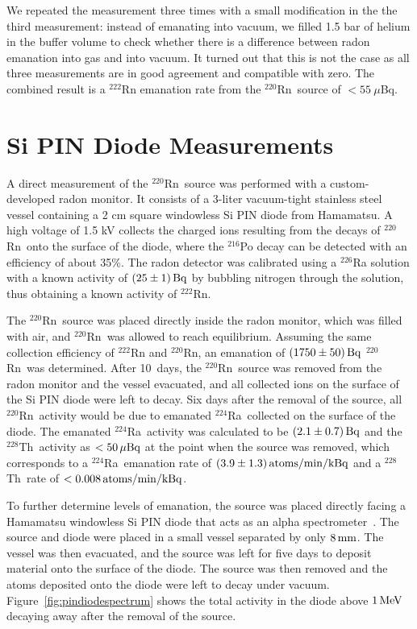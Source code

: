 We repeated the measurement three times with a small modification in the the third measurement: instead of emanating into vacuum, we filled 1.5 bar of helium in the buffer volume to check whether there is a difference between radon emanation into gas and into vacuum. It turned out that this is not the case as all three measurements are in good agreement and compatible with zero. The combined result is a $^{222}$Rn emanation rate from the $^{220}$Rn~source of $<55~\mu$Bq.

\section{Si PIN Diode Measurements}
\label{sec:diode}
A direct measurement of the $^{220}$Rn~source was performed with a custom-developed radon monitor. It consists of a 3-liter vacuum-tight stainless steel vessel containing a 2 cm square windowless Si PIN diode from Hamamatsu. A high voltage of 1.5 kV collects the charged ions resulting from the decays of $^{220}$Rn~onto the surface of the diode, where the $^{216}$Po decay can be detected with an efficiency of about 35\%. The radon detector was calibrated using a $^{226}$Ra solution with a known activity of $(25\pm1)\,\mathrm{Bq}$ by bubbling nitrogen through the solution, thus obtaining a known activity of $^{222}$Rn.

The $^{220}$Rn~source was placed directly inside the radon monitor, which was filled with air, and $^{220}$Rn~was allowed to reach equilibrium. Assuming the same collection efficiency of $^{222}$Rn and $^{220}$Rn, an emanation of $(1750\pm50)\,\mathrm{Bq}$ $^{220}$Rn~was determined. After 10~days, the $^{220}$Rn~source was removed from the radon monitor and the vessel evacuated, and all collected ions on the surface of the Si PIN diode were left to decay. Six days after the removal of the source, all $^{220}$Rn~activity would be due to emanated $^{224}$Ra~collected on the surface of the diode. The emanated $^{224}$Ra~activity was calculated to be $(2.1\pm0.7)\,\mathrm{Bq}$ and the $^{228}$Th~activity as $<50\,\mu\mathrm{Bq}$ at the point when the source was removed, which corresponds to a $^{224}$Ra~emanation rate of $(3.9\pm1.3)\,\mathrm{atoms/min/kBq}$ and a $^{228}$Th~rate of $<0.008\,\mathrm{atoms/min/kBq}$.

To further determine levels of emanation, the source was placed directly facing a Hamamatsu windowless Si PIN diode that acts as an alpha spectrometer~\cite{Bray:2014}. The source and diode were placed in a small vessel separated by only $8\,\mathrm{mm}$. The vessel was then evacuated, and the source was left for five days to deposit material onto the surface of the diode. The source was then removed and the atoms deposited onto the diode were left to decay under vacuum. Figure~\ref{fig:pindiodespectrum} shows the total activity in the diode above $1\,\mathrm{MeV}$ decaying away after the removal of the source.

